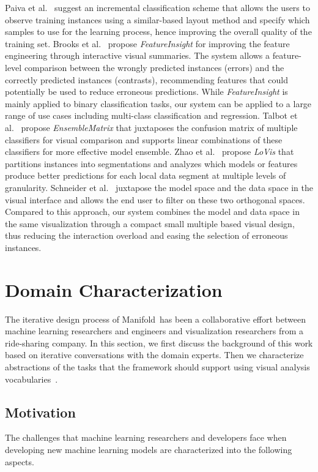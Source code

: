 \documentclass[preprint,journal]{vgtc}       %
\newcommand{\techname}{Manifold}
\begin{document}
Paiva et al.~\cite{paiva2015approach} suggest an incremental classification scheme that allows the users to observe training instances using a similar-based layout method and specify which samples to use for the learning process, hence improving the overall quality of the training set. Brooks et al.~\cite{brooks2015featureinsight} propose \textit{FeatureInsight} for improving the feature engineering through interactive visual summaries. The system allows a feature-level comparison between the wrongly predicted instances (errors) and the correctly predicted instances (contrasts), recommending features that could potentially be used to reduce erroneous predictions. While \textit{FeatureInsight} is mainly applied to binary classification tasks, our system can be applied to a large range of use cases including multi-class classification and regression. Talbot et al.~\cite{talbot2009ensemblematrix} propose \textit{EnsembleMatrix} that juxtaposes the confusion matrix of multiple classifiers for visual comparison and supports linear combinations of these classifiers for more effective model ensemble. Zhao et al.~\cite{zhao2014lovis} propose \textit{LoVis} that partitions instances into segmentations and analyzes which models or features produce better predictions for each local data segment at multiple levels of granularity. Schneider et al.~\cite{schneider2017visual} juxtapose the model space and the data space in the visual interface and allows the end user to filter on these two orthogonal spaces. Compared to this approach, our system combines the model and data space in the same visualization through a compact small multiple based visual design, thus reducing the interaction overload and easing the selection of erroneous instances.

\section{Domain Characterization}
The iterative design process of \techname\ has been a collaborative effort between machine learning researchers and engineers and visualization researchers from a ride-sharing company. In this section, we first discuss the background of this work based on iterative conversations with the domain experts. Then we characterize abstractions of the tasks that the framework should support using visual analysis vocabularies~\cite{munzner2009nested}.

\subsection{Motivation}
The challenges that machine learning researchers and developers face when developing new machine learning models are characterized into the following aspects.
\end{document}
